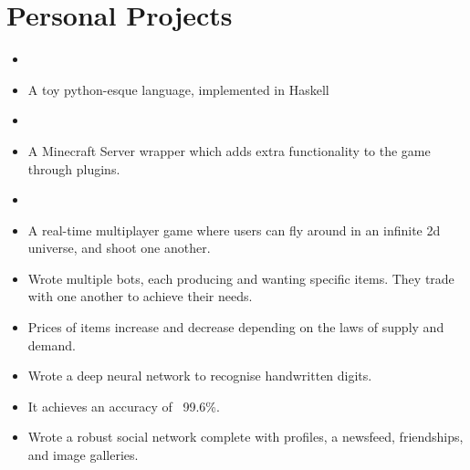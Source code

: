 \documentclass{jcgcv}
\begin{document}
\begin{column}



\section{Personal Projects}

\begin{itemize}
  \item {}
  \item A toy python-esque language, implemented in Haskell
\end{itemize}

\begin{itemize}
  \item {}
  \item A Minecraft Server wrapper which adds extra functionality to the game through plugins.
\end{itemize}

\begin{itemize}
  \item {}
  \item A real-time multiplayer game where users can fly around in an infinite 2d universe, and shoot one another.
\end{itemize}

\begin{itemize}
  \item Wrote multiple bots, each producing and wanting specific items. They trade with one another to achieve their needs.
  \item Prices of items increase and decrease depending on the laws of supply and demand.
\end{itemize}

\begin{itemize}
  \item Wrote a deep neural network to recognise handwritten digits.
  \item It achieves an accuracy of ~99.6\%.
\end{itemize}

\begin{itemize}
  \item Wrote a robust social network complete with profiles, a newsfeed, friendships, and image galleries.
\end{itemize}


\end{column}
\end{document}
